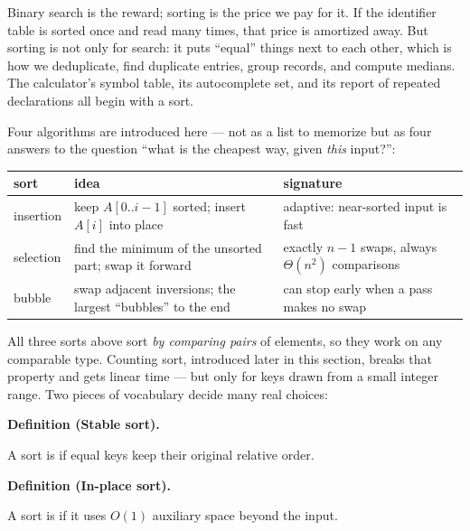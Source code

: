 \documentclass[11pt]{article}
\newenvironment{definitionbox}[1]{%
  \par\noindent\textbf{Definition (#1).}\ \itshape
}{\par\vspace{0.3em}}
\begin{document}
Binary search is the reward; sorting is the price we pay for it. If the identifier table is sorted once and read many times, that price is amortized away. But sorting is not only for search: it puts ``equal'' things next to each other, which is how we deduplicate, find duplicate entries, group records, and compute medians. The calculator's symbol table, its autocomplete set, and its report of repeated declarations all begin with a sort.

Four algorithms are introduced here --- not as a list to memorize but as four answers to the question ``what is the cheapest way, given \emph{this} input?'':

\begin{center}
{\footnotesize
\begin{tabular}{>{\raggedright\arraybackslash}p{2.2cm}
                >{\raggedright\arraybackslash}p{5.6cm}
                >{\raggedright\arraybackslash}p{4.6cm}}
  \toprule
  \textbf{sort} & \textbf{idea} & \textbf{signature} \\
  \midrule
  insertion & keep $A[0..i-1]$ sorted; insert $A[i]$ into place &
    adaptive: near-sorted input is fast \\
  selection & find the minimum of the unsorted part; swap it forward &
    exactly $n-1$ swaps, always $\Theta(n^2)$ comparisons \\
  bubble & swap adjacent inversions; the largest ``bubbles'' to the end &
    can stop early when a pass makes no swap \\
  \bottomrule
\end{tabular}}
\end{center}

All three sorts above sort \emph{by comparing pairs} of elements, so they work on any comparable type. Counting sort, introduced later in this section, breaks that property and gets linear time --- but only for keys drawn from a small integer range. Two pieces of vocabulary decide many real choices:

\begin{definitionbox}{Stable sort}
A sort is  if equal keys keep their original relative order.
\end{definitionbox}
\begin{definitionbox}{In-place sort}
A sort is  if it uses $O(1)$ auxiliary space beyond the input.
\end{definitionbox}

\end{document}
